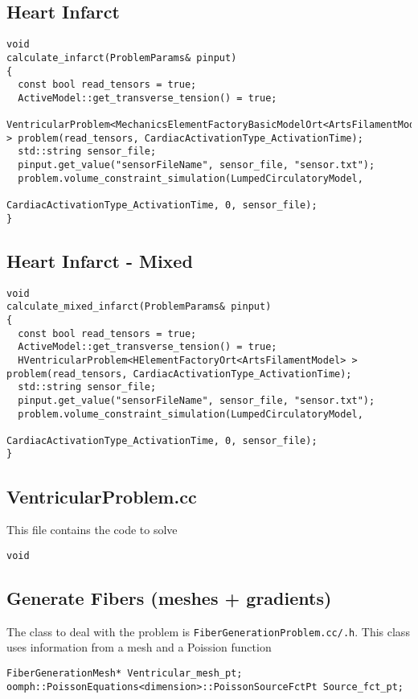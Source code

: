 \subsection{Heart Infarct}
  
\begin{verbatim}
void
calculate_infarct(ProblemParams& pinput)
{
  const bool read_tensors = true;
  ActiveModel::get_transverse_tension() = true;
  VentricularProblem<MechanicsElementFactoryBasicModelOrt<ArtsFilamentModel> > problem(read_tensors, CardiacActivationType_ActivationTime);
  std::string sensor_file;
  pinput.get_value("sensorFileName", sensor_file, "sensor.txt");
  problem.volume_constraint_simulation(LumpedCirculatoryModel,
                                       CardiacActivationType_ActivationTime, 0, sensor_file);
}
\end{verbatim}   

\subsection{Heart Infarct - Mixed}

\begin{verbatim}
void
calculate_mixed_infarct(ProblemParams& pinput)
{
  const bool read_tensors = true;
  ActiveModel::get_transverse_tension() = true;
  HVentricularProblem<HElementFactoryOrt<ArtsFilamentModel> > problem(read_tensors, CardiacActivationType_ActivationTime);
  std::string sensor_file;
  pinput.get_value("sensorFileName", sensor_file, "sensor.txt");
  problem.volume_constraint_simulation(LumpedCirculatoryModel,
                                       CardiacActivationType_ActivationTime, 0, sensor_file);
}
\end{verbatim}
  
\subsection{VentricularProblem.cc}
  
This file contains the code to solve 
\begin{verbatim}
void 
\end{verbatim}
  
\subsection{Generate Fibers (meshes + gradients)}
\label{sec:fiber_generation}

The class to deal with the problem is \verb!FiberGenerationProblem.cc/.h!. 
This class uses information from a mesh and a Poission function
\begin{verbatim}
FiberGenerationMesh* Ventricular_mesh_pt;
oomph::PoissonEquations<dimension>::PoissonSourceFctPt Source_fct_pt;
\end{verbatim}

